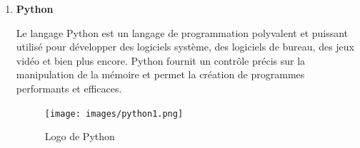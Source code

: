 \begin{enumerate}
\begin{center}
    \end{center}
    \paragraph{\\}\paragraph{\\}\paragraph{\\}

      
     \item \textbf{Python}
    
Le langage Python est un langage de programmation polyvalent et puissant utilisé pour développer des logiciels système, des logiciels de bureau, des jeux vidéo et bien plus encore. Python fournit un contrôle précis sur la manipulation de la mémoire et permet la création de programmes performants et efficaces.

 \renewcommand{\thefigure}{6}
    
    \begin{center}
        \begin{figure}[htbp]
    \centering
   \texttt{[image: images/python1.png]} 
    \caption{Logo de Python}
    \label{fig:Python}
\end{figure}
        
    \end{center}
   
   \paragraph{\\}
   
   \paragraph{\\}
  
    \paragraph{\\}\paragraph{\\}
  

\end{enumerate}
